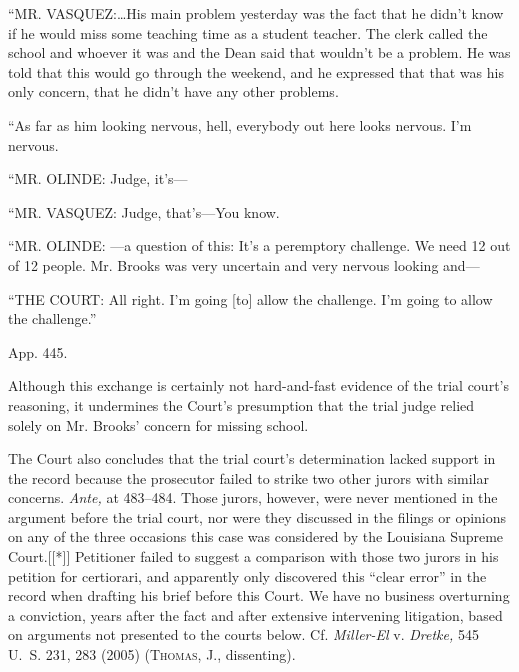       ``MR. VASQUEZ:\dots His main problem yesterday was the fact
    that he didn't know if he would miss some teaching time as a
    student teacher. The clerk called the school and whoever it was and
    the Dean said that wouldn't be a problem. He was told that this
    would go through the weekend, and he expressed that that was his
    only concern, that he didn't have any other problems.

      ``As far as him looking nervous, hell, everybody out here looks
    nervous. I'm nervous.

      ``MR. OLINDE: Judge, it's---\newpage 

      ``MR. VASQUEZ: Judge, that's---You know.

      ``MR. OLINDE: ---a question of this: It's a peremptory
    challenge. We need 12 out of 12 people. Mr. Brooks was very
    uncertain and very nervous looking and---

      ``THE COURT: All right. I'm going [to] allow the challenge.
    I'm going to allow the challenge.''

    App. 445.

\noindent Although this exchange is certainly not hard-and-fast evidence of the
trial court's reasoning, it undermines the Court's presumption that
the trial judge relied solely on Mr. Brooks' concern for missing
school.

  The Court also concludes that the trial court's determination lacked
support in the record because the prosecutor failed to strike two other
jurors with similar concerns. \emph{Ante,} at 483--484. Those jurors,
however, were never mentioned in the argument before the trial court,
nor were they discussed in the filings or opinions on any of the three
occasions this case was considered by the Louisiana Supreme Court.[[*]]
Petitioner failed to suggest a comparison with those two jurors in his
petition for certiorari, and apparently only discovered this ``clear
error'' in the record when drafting his brief before this Court. We
have no business overturning a conviction, years after the fact and
after extensive intervening litigation, based on arguments not presented
to the courts below. Cf. \emph{Miller-El} v. \emph{Dretke,} 545 U.~S. 231,
283 (2005) (\textsc{Thomas,} J., dissenting).

